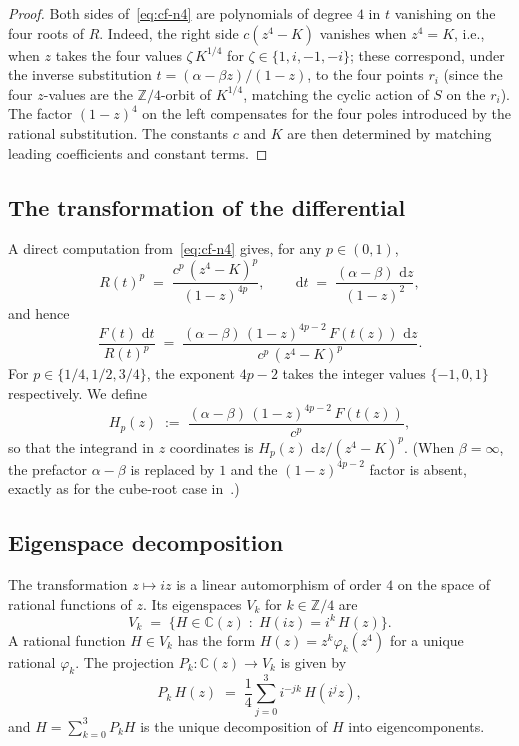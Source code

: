 \documentclass[11pt,a4paper]{article}
\theoremstyle{plain}
\theoremstyle{definition}
\theoremstyle{remark}
\newcommand{\C}{\mathbb{C}}
\newcommand{\Z}{\mathbb{Z}}
\renewcommand{\d}{\,\mathrm{d}}
\begin{document}
\begin{proof}
Both sides of~\eqref{eq:cf-n4} are polynomials of degree $4$ in $t$ vanishing on the four roots of $R$. Indeed, the right side $c(z^4 - K)$ vanishes when $z^4 = K$, i.e., when $z$ takes the four values $\zeta\,K^{1/4}$ for $\zeta \in \{1, i, -1, -i\}$; these correspond, under the inverse substitution $t = (\alpha - \beta z)/(1 - z)$, to the four points $r_i$ (since the four $z$-values are the $\Z/4$-orbit of $K^{1/4}$, matching the cyclic action of $S$ on the $r_i$). The factor $(1-z)^4$ on the left compensates for the four poles introduced by the rational substitution. The constants $c$ and $K$ are then determined by matching leading coefficients and constant terms.
\end{proof}

\subsection*{The transformation of the differential}

A direct computation from~\eqref{eq:cf-n4} gives, for any $p \in (0, 1)$,
\begin{equation}\label{eq:R-power-p}
  R(t)^p \;=\; \frac{c^p\,(z^4 - K)^p}{(1-z)^{4p}}, \qquad
  \d t \;=\; \frac{(\alpha - \beta)\,\d z}{(1-z)^2},
\end{equation}
and hence
\begin{equation}\label{eq:differential}
  \frac{F(t)\,\d t}{R(t)^p} \;=\; \frac{(\alpha - \beta)\,(1-z)^{4p - 2}\,F(t(z))\,\d z}{c^p\,(z^4 - K)^p}.
\end{equation}
For $p \in \{1/4, 1/2, 3/4\}$, the exponent $4p - 2$ takes the integer values $\{-1, 0, 1\}$ respectively. We define
\begin{equation}\label{eq:Hp-def}
  H_p(z) \;:=\; \frac{(\alpha - \beta)\,(1-z)^{4p-2}\,F(t(z))}{c^p},
\end{equation}
so that the integrand in $z$ coordinates is $H_p(z)\,\d z / (z^4 - K)^p$. (When $\beta = \infty$, the prefactor $\alpha - \beta$ is replaced by $1$ and the $(1-z)^{4p-2}$ factor is absent, exactly as for the cube-root case in~\cite{GoursatCubic}.)

\subsection*{Eigenspace decomposition}

The transformation $z \mapsto iz$ is a linear automorphism of order $4$ on the space of rational functions of $z$. Its eigenspaces $V_k$ for $k \in \Z/4$ are
\[
  V_k \;=\; \{H \in \C(z) \;:\; H(iz) = i^k\,H(z)\}.
\]
A rational function $H \in V_k$ has the form $H(z) = z^k \varphi_k(z^4)$ for a unique rational $\varphi_k$. The projection $P_k\colon \C(z) \to V_k$ is given by
\begin{equation}\label{eq:projection-Vk}
  P_k\,H(z) \;=\; \frac{1}{4}\sum_{j=0}^{3} i^{-jk}\,H(i^j z),
\end{equation}
and $H = \sum_{k=0}^{3} P_k H$ is the unique decomposition of $H$ into eigencomponents.
\end{document}
